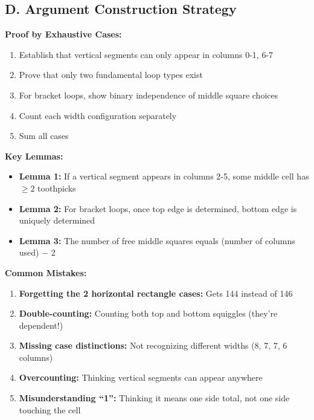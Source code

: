 \documentclass[12pt]{article}
\begin{document}
\begin{strategicbox}
\subsection*{D. Argument Construction Strategy}

\textbf{Proof by Exhaustive Cases:}
\begin{enumerate}
    \item Establish that vertical segments can only appear in columns 0-1, 6-7
    \item Prove that only two fundamental loop types exist
    \item For bracket loops, show binary independence of middle square choices
    \item Count each width configuration separately
    \item Sum all cases
\end{enumerate}

\textbf{Key Lemmas:}
\begin{itemize}
    \item \textbf{Lemma 1:} If a vertical segment appears in columns 2-5, some middle cell has $\geq 2$ toothpicks
    \item \textbf{Lemma 2:} For bracket loops, once top edge is determined, bottom edge is uniquely determined
    \item \textbf{Lemma 3:} The number of free middle squares equals (number of columns used) $-$ 2
\end{itemize}

\end{strategicbox}

\begin{warningbox}
\textbf{Common Mistakes:}
\begin{enumerate}
    \item \textbf{Forgetting the 2 horizontal rectangle cases:} Gets 144 instead of 146
    \item \textbf{Double-counting:} Counting both top and bottom squiggles (they're dependent!)
    \item \textbf{Missing case distinctions:} Not recognizing different widths (8, 7, 7, 6 columns)
    \item \textbf{Overcounting:} Thinking vertical segments can appear anywhere
    \item \textbf{Misunderstanding ``1'':} Thinking it means one side total, not one side touching the cell
\end{enumerate}
\end{warningbox}
\end{document}
